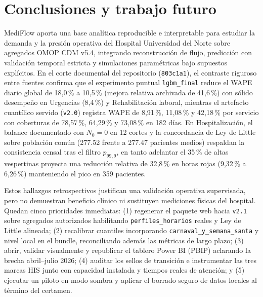 
\section{Conclusiones y trabajo futuro}

MediFlow aporta una base analítica reproducible e interpretable para estudiar la demanda y la presión operativa del Hospital Universidad del Norte sobre agregados OMOP CDM v5.4, integrando reconstrucción de flujo, predicción con validación temporal estricta y simulaciones paramétricas bajo supuestos explícitos. En el corte documental del repositorio (\texttt{803c1a1}), el contraste riguroso entre fuentes confirma que el experimento puntual \texttt{lgbm\_final} reduce el WAPE diario global de 18,0\,\% a 10,5\,\% (mejora relativa archivada de 41,6\,\%) con sólido desempeño en Urgencias (8,4\,\%) y Rehabilitación laboral, mientras el artefacto cuantílico servido (\texttt{v2.0}) registra WAPE de 8,91\,\%, 11,08\,\% y 42,18\,\% por servicio con coberturas de 78,57\,\%, 64,29\,\% y 73,08\,\% en 182 días. En Hospitalización, el balance documentado con $N_0=0$ en 12 cortes y la concordancia de Ley de Little sobre población común (\num{277,52} frente a \num{277,47} pacientes medios) respaldan la consistencia censal tras el filtro $p_{99{,}9}$, en tanto adelantar el 35\,\% de altas vespertinas proyecta una reducción relativa de 32,8\,\% en horas rojas (9,32\,\% a 6,26\,\%) manteniendo el pico en 359 pacientes.

Estos hallazgos retrospectivos justifican una validación operativa supervisada, pero no demuestran beneficio clínico ni sustituyen mediciones físicas del hospital. Quedan cinco prioridades inmediatas: (1) regenerar el paquete web hacia \texttt{v2.1} sobre agregados autorizados habilitando \texttt{perfiles\_horarios} reales y Ley de Little alineada; (2) recalibrar cuantiles incorporando \texttt{carnaval\_y\_semana\_santa} y nivel local en el bundle, reconciliando además las métricas de largo plazo; (3) abrir, validar visualmente y republicar el tablero Power BI (PBIP) aclarando la brecha abril--julio 2026; (4) auditar los sellos de transición e instrumentar las tres marcas HIS junto con capacidad instalada y tiempos reales de atención; y (5) ejecutar un piloto en modo sombra y aplicar el borrado seguro de datos locales al término del certamen.

